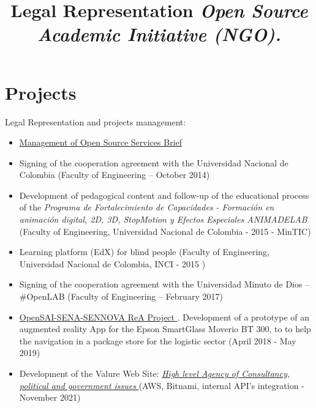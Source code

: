 \documentclass[overlapped,line,final]{res}
\begin{document}
\begin{resume}
\begin{itemize}
\end{itemize}
    

\vspace{0.5cm}
\section{\sc Projects } %
\vspace{0.5cm}
\title{\bf Legal Representation
	\newline \em Open Source Academic Initiative (NGO).
}
\begin{position}
Legal Representation and projects management:
	\begin{itemize}
		\item \href{https://opensai.org/business}{Management of Open Source Services Brief }
		\item Signing of the cooperation agreement with the Universidad Nacional de Colombia (Faculty of Engineering – October 2014)
		\item Development of pedagogical content and follow-up of the educational process of the \textit{Programa de Fortalecimiento de Capacidades - Formación en animación digital, 2D, 3D, StopMotion y Efectos Especiales ANIMADELAB} (Faculty of Engineering, Universidad Nacional de Colombia - 2015 - MinTIC)
		\item Learning platform (EdX) for blind people (Faculty of Engineering, Universidad Nacional de Colombia, INCI - 2015 )
		\item Signing of the cooperation agreement with the Universidad Minuto de Dios – \#OpenLAB (Faculty of Engineering – February 2017)
		\item \href{https://rea.opensai.org/}{OpenSAI-SENA-SENNOVA ReA Project }. Development of a prototype of an augmented reality App for the Epson SmartGlass Moverio BT 300, to to help the navigation in a package store for the logistic sector (April 2018 - May 2019)
		\item Development of the Valure Web Site: \href{https://valure.com.co}{\textit{High level Agency of Consultancy, political and government issues} } (AWS, Bitnami, internal API's integration - November 2021)

\end{itemize}
\end{position}
\end{resume}
\end{document}
